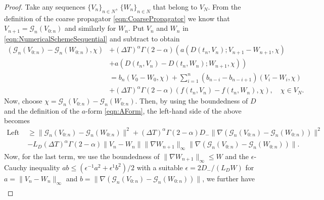 \documentclass[12pt,a4paper]{article}
\begin{document}
\begin{proof}
	Take any sequences $\{V_n\}_{n\in N}$, $\{W_n\}_{n\in N}$ that belong to $V_N$. From the definition of the coarse propagator \eqref{eqn:CoarsePropagator} we know that $V_{n+1} = \mathcal{G}_n\left(V_{0:n}\right)$ and similarly for $W_n$. Put $V_n$ and $W_n$ in \eqref{eqn:NumericalSchemeSequential} and subtract to obtain
	\begin{equation}
		\begin{split}
			\left(\mathcal{G}_n\left(V_{0:n}\right) - \mathcal{G}_n\left(W_{0:n}\right), \chi\right) &+ \left(\Delta T\right)^\alpha \Gamma(2-\alpha) \left(a(D(t_n, V_{n}); V_{n+1} - W_{n+1}, \chi) \right.\\
			&\left.+ a(D(t_n, V_{n})-D(t_n, W_{n}); W_{n+1}, \chi)\right)\\
			&= b_{n} \left(V_{0}-W_{0}, \chi\right) + \sum_{i = 1}^{n} \left(b_{n-i}-b_{n-i+1}\right) \left(V_{i}-W_{i}, \chi\right) \\
			&+ \left(\Delta T\right)^\alpha \Gamma(2-\alpha) (f(t_n, V_{n}) - f(t_n, W_{n}), \chi), \quad \chi \in V_N.
		\end{split}
	\end{equation}
	Now, choose $\chi = \mathcal{G}_n\left(V_{0:n}\right) - \mathcal{G}_n\left(W_{0:n}\right)$. Then, by using the boundedness of $D$ and the definition of the $a$-form \eqref{eqn:AForm}, the left-hand side of the above becomes
	\begin{equation}
		\begin{split}
			\text{Left } &\geq \|\mathcal{G}_n\left(V_{0:n}\right) - \mathcal{G}_n\left(W_{0:n}\right)\|^2 + \left(\Delta T\right)^\alpha \Gamma(2-\alpha) D_- \|\nabla\left(\mathcal{G}_n\left(V_{0:n}\right) - \mathcal{G}_n\left(W_{0:n}\right)\right)\|^2 \\
			&- L_D\left(\Delta T\right)^\alpha \Gamma(2-\alpha)\|V_n - W_n\| \|\nabla W_{n+1}\|_\infty \|\nabla\left(\mathcal{G}_n\left(V_{0:n}\right) - \mathcal{G}_n\left(W_{0:n}\right)\right)\|.
		\end{split}
	\end{equation}
	Now, for the last term, we use the boundedness of $\|\nabla W_{n+1}\|_\infty \leq W$ and the $\epsilon$-Cauchy inequality $ab \leq (\epsilon^{-1} a^2 + \epsilon^{1} b^2)/2$ with a suitable $\epsilon = 2 D_-/(L_D W)$ for $a=\|V_n - W_n\|_\infty$ and $b = \|\nabla\left(\mathcal{G}_n\left(V_{0:n}\right) - \mathcal{G}_n\left(W_{0:n}\right)\right)\|$, we further have
	\begin{equation}\label{eqn:LipschitzLeft}
		\begin{split}

\end{split}
\end{equation}
\end{proof}
\end{document}
